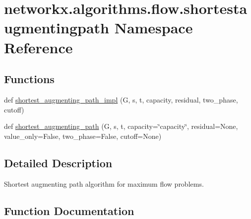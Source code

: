 \hypertarget{namespacenetworkx_1_1algorithms_1_1flow_1_1shortestaugmentingpath}{}\section{networkx.\+algorithms.\+flow.\+shortestaugmentingpath Namespace Reference}
\label{namespacenetworkx_1_1algorithms_1_1flow_1_1shortestaugmentingpath}
\subsection*{Functions}
\begin{DoxyCompactItemize}
\item 
def \hyperlink{namespacenetworkx_1_1algorithms_1_1flow_1_1shortestaugmentingpath_acea06dbc2978d31684e57339d848f8e0}{shortest\+\_\+augmenting\+\_\+path\+\_\+impl} (G, s, t, capacity, residual, two\+\_\+phase, cutoff)
\item 
def \hyperlink{namespacenetworkx_1_1algorithms_1_1flow_1_1shortestaugmentingpath_a1fca722f75ab9d80b69148083f8fb88b}{shortest\+\_\+augmenting\+\_\+path} (G, s, t, capacity=\char`\"{}capacity\char`\"{}, residual=None, value\+\_\+only=False, two\+\_\+phase=False, cutoff=None)
\end{DoxyCompactItemize}


\subsection{Detailed Description}
\begin{DoxyVerb}Shortest augmenting path algorithm for maximum flow problems.
\end{DoxyVerb}
 

\subsection{Function Documentation}
\mbox{\label{namespacenetworkx_1_1algorithms_1_1flow_1_1shortestaugmentingpath_a1fca722f75ab9d80b69148083f8fb88b}} 
